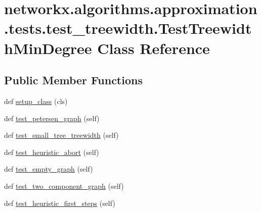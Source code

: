 \hypertarget{classnetworkx_1_1algorithms_1_1approximation_1_1tests_1_1test__treewidth_1_1TestTreewidthMinDegree}{}\section{networkx.\+algorithms.\+approximation.\+tests.\+test\+\_\+treewidth.\+Test\+Treewidth\+Min\+Degree Class Reference}
\label{classnetworkx_1_1algorithms_1_1approximation_1_1tests_1_1test__treewidth_1_1TestTreewidthMinDegree}
\subsection*{Public Member Functions}
\begin{DoxyCompactItemize}
\item 
def \hyperlink{classnetworkx_1_1algorithms_1_1approximation_1_1tests_1_1test__treewidth_1_1TestTreewidthMinDegree_a59fae7d8605b660221ab7690a6d16981}{setup\+\_\+class} (cls)
\item 
def \hyperlink{classnetworkx_1_1algorithms_1_1approximation_1_1tests_1_1test__treewidth_1_1TestTreewidthMinDegree_af6270232d708e92b1559975639890305}{test\+\_\+petersen\+\_\+graph} (self)
\item 
def \hyperlink{classnetworkx_1_1algorithms_1_1approximation_1_1tests_1_1test__treewidth_1_1TestTreewidthMinDegree_a0cb2b22eaa4b6a4fdc30a7da1dfbc0a9}{test\+\_\+small\+\_\+tree\+\_\+treewidth} (self)
\item 
def \hyperlink{classnetworkx_1_1algorithms_1_1approximation_1_1tests_1_1test__treewidth_1_1TestTreewidthMinDegree_a950bad6b7da455c53c21c2f342090c80}{test\+\_\+heuristic\+\_\+abort} (self)
\item 
def \hyperlink{classnetworkx_1_1algorithms_1_1approximation_1_1tests_1_1test__treewidth_1_1TestTreewidthMinDegree_a187412863d0c6b896bb9df69b39a7ac3}{test\+\_\+empty\+\_\+graph} (self)
\item 
def \hyperlink{classnetworkx_1_1algorithms_1_1approximation_1_1tests_1_1test__treewidth_1_1TestTreewidthMinDegree_ae4037bfe1739abda03cf0d0f2bcc1474}{test\+\_\+two\+\_\+component\+\_\+graph} (self)
\item 
def \hyperlink{classnetworkx_1_1algorithms_1_1approximation_1_1tests_1_1test__treewidth_1_1TestTreewidthMinDegree_a3f95e7edcc4dd3894ed9943644f34dc2}{test\+\_\+heuristic\+\_\+first\+\_\+steps} (self)
\end{DoxyCompactItemize}
